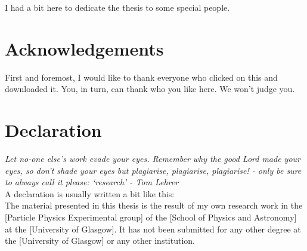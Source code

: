 \documentclass[12pt,titlepage,oneside]{book}
\newcommand{\tcg}[1]{\textcolor{GRASSGREEN}{#1}} %
\newcommand{\tit}[1]{\textit{#1}} %
\begin{document}

\newpage
\clearpage
\begin{center}
    \thispagestyle{empty}
    \vspace*{\fill}
    \begin{flushleft}
    I had a bit here to dedicate the thesis to some special people.
    \end{flushleft}
    \vspace*{\fill}
\end{center}
\clearpage


\chapter{Acknowledgements}
\doublespacing

First and foremost, I would like to thank everyone who clicked on this and downloaded it. You, in turn, can thank who you like here. We won't judge you.\\

\singlespacing

\tableofcontents
\cleardoublepage

{}
\listoffigures
\cleardoublepage

{}
\listoftables

\chapter{Declaration}
\tit{Let no-one else's work evade your eyes. Remember why the good Lord made your eyes, so don't shade your eyes but plagiarise, plagiarise, plagiarise! - only be sure to always call it please: `research' - Tom Lehrer}\\

\tcg{A declaration is usually written a bit like this:}\\

The material presented in this thesis is the result of my own research work in the [Particle Physics Experimental group] of the [School of Physics and Astronomy] at the [University of Glasgow]. It has not been submitted for any other degree at the [University of Glasgow] or any other institution.\\
\end{document}
